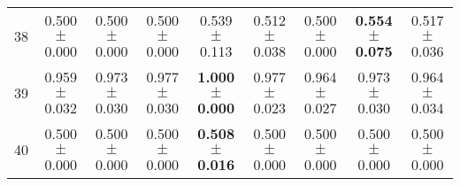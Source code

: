 \begin{table}[!ht]
{\begin{tabular}{r c c c c c c c c}
38 & 0.500 $\pm$ 0.000 & 0.500 $\pm$ 0.000 & 0.500 $\pm$ 0.000 & 0.539 $\pm$ 0.113 & 0.512 $\pm$ 0.038 & 0.500 $\pm$ 0.000 & \textbf{0.554 $\pm$ 0.075} & 0.517 $\pm$ 0.036 \\
39 & 0.959 $\pm$ 0.032 & 0.973 $\pm$ 0.030 & 0.977 $\pm$ 0.030 & \textbf{1.000 $\pm$ 0.000} & 0.977 $\pm$ 0.023 & 0.964 $\pm$ 0.027 & 0.973 $\pm$ 0.030 & 0.964 $\pm$ 0.034 \\
40 & 0.500 $\pm$ 0.000 & 0.500 $\pm$ 0.000 & 0.500 $\pm$ 0.000 & \textbf{0.508 $\pm$ 0.016} & 0.500 $\pm$ 0.000 & 0.500 $\pm$ 0.000 & 0.500 $\pm$ 0.000 & 0.500 $\pm$ 0.000 \\
\end{tabular}}
\end{table}
